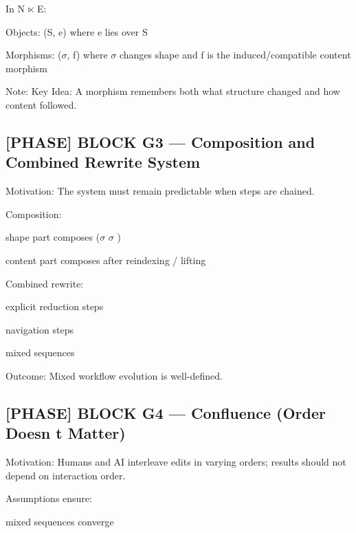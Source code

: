 In N $\ltimes$ E:\par

Objects: (S, e) where e lies over S\par

Morphisms: ($\sigma$, f) where $\sigma$ changes shape and f is the induced/compatible content morphism\par

Note: Key Idea: A morphism remembers both what structure changed and how content followed. \par

\subsection*{[PHASE] BLOCK G3 --- Composition and Combined Rewrite System}

Motivation: The system must remain predictable when steps are chained.\par

Composition:\par

shape part composes ($\sigma$ $\sigma$ )\par

content part composes after reindexing / lifting\par

Combined rewrite:\par

explicit reduction steps\par

navigation steps\par

mixed sequences\par

 Outcome: Mixed workflow evolution is well-defined.\par

\subsection*{[PHASE] BLOCK G4 --- Confluence (Order Doesn t Matter)}

Motivation: Humans and AI interleave edits in varying orders; results should not depend on interaction order.\par

Assumptions ensure:\par

mixed sequences converge\par

